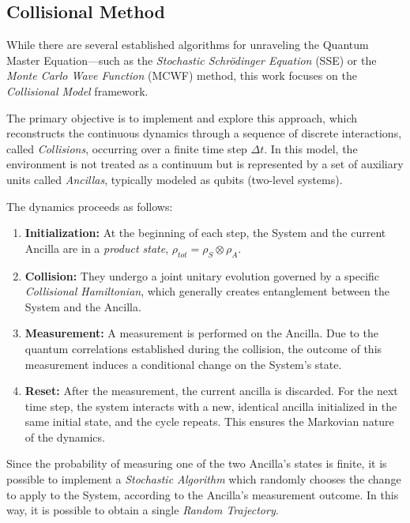 \documentclass[a4paper,12pt]{article}
\begin{document}
	\subsection{Collisional Method}
	\label{sub:CM}
	While there are several established algorithms for unraveling the Quantum Master Equation—such as the \textit{Stochastic Schr\"odinger Equation} (SSE) or the \textit{Monte Carlo Wave Function} (MCWF) method, this work focuses on the \textit{Collisional Model} framework.

	The primary objective is to implement and explore this approach, which reconstructs the continuous dynamics through a sequence of discrete interactions, called \textit{Collisions}, occurring over a finite time step $\Delta t$.
	In this model, the environment is not treated as a continuum but is represented by a set of auxiliary units called \textit{Ancillas}, typically modeled as qubits (two-level systems).

	The dynamics proceeds as follows:
	\begin{enumerate}
		\item \textbf{Initialization:} At the beginning of each step, the System and the current Ancilla are in a \textit{product state}, $\rho_{tot} = \rho_S \otimes \rho_A$.
		\item \textbf{Collision:} They undergo a joint unitary evolution governed by a specific \textit{Collisional Hamiltonian}, which generally creates entanglement between the System and the Ancilla.
		\item \textbf{Measurement:} A measurement is performed on the Ancilla. Due to the quantum correlations established during the collision, the outcome of this measurement induces a conditional change on the System's state.
		\item \textbf{Reset:} After the measurement, the current ancilla is discarded. For the next time step, the system interacts with a new, identical ancilla initialized in the same initial state, and the cycle repeats. This ensures the Markovian nature of the dynamics.
	\end{enumerate}

	Since the probability of measuring one of the two Ancilla's states is finite, it is possible to implement a \textit{Stochastic Algorithm} which randomly chooses the change to apply to the System, according to the Ancilla's measurement outcome. In this way, it is possible to obtain a single \textit{Random Trajectory}.
\end{document}
